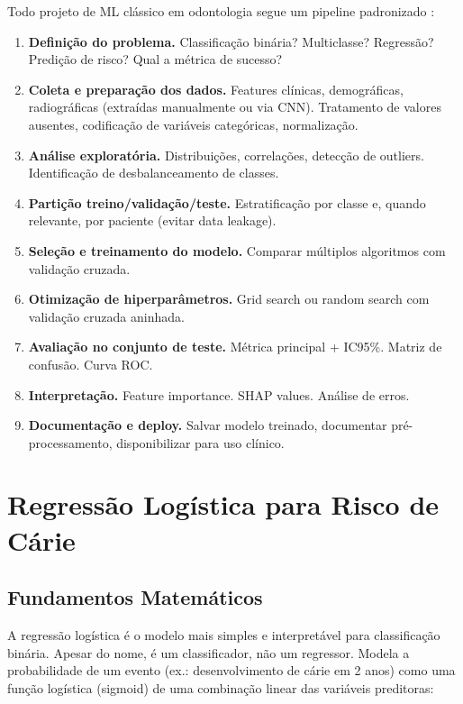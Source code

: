 Todo projeto de ML clássico em odontologia segue um pipeline padronizado :

\begin{enumerate}
    \item \textbf{Definição do problema.} Classificação binária? Multiclasse? Regressão? Predição de risco? Qual a métrica de sucesso?
    \item \textbf{Coleta e preparação dos dados.} Features clínicas, demográficas, radiográficas (extraídas manualmente ou via CNN). Tratamento de valores ausentes, codificação de variáveis categóricas, normalização.
    \item \textbf{Análise exploratória.} Distribuições, correlações, detecção de outliers. Identificação de desbalanceamento de classes.
    \item \textbf{Partição treino/validação/teste.} Estratificação por classe e, quando relevante, por paciente (evitar data leakage).
    \item \textbf{Seleção e treinamento do modelo.} Comparar múltiplos algoritmos com validação cruzada.
    \item \textbf{Otimização de hiperparâmetros.} Grid search ou random search com validação cruzada aninhada.
    \item \textbf{Avaliação no conjunto de teste.} Métrica principal + IC95\%. Matriz de confusão. Curva ROC.
    \item \textbf{Interpretação.} Feature importance. SHAP values. Análise de erros.
    \item \textbf{Documentação e deploy.} Salvar modelo treinado, documentar pré-processamento, disponibilizar para uso clínico.
\end{enumerate}

\section{Regressão Logística para Risco de Cárie}

\subsection{Fundamentos Matemáticos}

A regressão logística  é o modelo mais simples e interpretável para classificação binária. Apesar do nome, é um classificador, não um regressor. Modela a probabilidade de um evento (ex.: desenvolvimento de cárie em 2 anos) como uma função logística (sigmoid) de uma combinação linear das variáveis preditoras:

